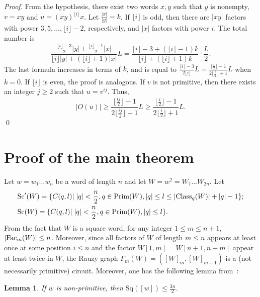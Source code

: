 \documentclass[runningheads,envcountsame,a4paper]{llncs}
\newtheorem{lem}[thm]{Lemma}
\newcommand{\fac}{\hbox{\rm Fac}}
\newcommand{\Class}{\hbox{\rm Class}}
\newcommand{\prim}{\hbox{\rm Prim}}
\newcommand{\sq}{\mathrm{Sq}}
\renewcommand{\sc}{\mathrm{Sc}}
\begin{document}
\begin{proof}
From the hypothesis, there exist two words $x, y$ such that $y$ is nonempty,  $v=xy$ and $u=(xy)^{\lfloor i \rfloor}x$. Let $\frac{|x|}{|y|}=k$. If $\lfloor i \rfloor$ is odd, then there are $|xy|$ factors with power $3,5,\ldots,\lfloor i \rfloor-2$, respectively, and $|x|$ factors with power $i$. The total number is 
$$\frac{\frac{\lfloor i \rfloor-3}{2}|y|+\frac{\lfloor i \rfloor-1}{2}|x|}{\lfloor i \rfloor|y|+(\lfloor i \rfloor+1)|x|}L=\frac{\lfloor i \rfloor-3+(\lfloor i \rfloor-1)
k}{\lfloor i \rfloor+(\lfloor i \rfloor+1)k}\cdot\frac{L}{2}.$$ The last formula increases in terms of $k$, and is equal to $\frac{\lfloor i \rfloor-3}{2\lfloor i \rfloor}L=\frac{\lfloor \frac i2 \rfloor-1}{2\lfloor \frac i2 \rfloor+1}L$ when $k=0$. If $\lfloor i \rfloor$ is even, the proof is analogous. 
If $v$ is not primitive, then there exists an integer $j\geq 2$ such that 
$u=v^{ij}$. Thus, 
$$|O(u)|\ge\frac{\lfloor \frac {ij}{2} \rfloor-1}{2\lfloor \frac {ij}{2} \rfloor+1}L\ge\frac{\lfloor \frac i2 \rfloor-1}{2\lfloor \frac i2 \rfloor+1}L.$$ \qed
\end{proof} 
\fi










\section{Proof of the main theorem}\label{sec4}

Let $w=w_1\ldots w_n$ be a word of length $n$ and let $W=w^2=W_1\ldots W_{2n}$. Let
\begin{eqnarray*}
&\sc'(W)=\{C(q,l)| \;|q|< \frac{n}{2}, q\in\prim(W), |q|\leq l\leq |\Class_q(W)|+|q|-1\};\\ 
&\sc(W)=\{C(q,l)| \;|q|< \frac{n}{2}, q\in\prim(W), |q|\leq l\}.    
\end{eqnarray*}
From the fact that $W$ is a square word, for any integer $1\leq m\le n+1$, $|\fac_m(W)|\leq n$. Moreover, since all factors of $W$ of length $m \leq n$ appears at least once at some position $i \leq n$ and the factor $W[1,m]=W[n+1,n+m]$ appear at least twice in $W$, the Rauzy graph $\Gamma_m(W)=([W]_m, [W]_{m+1})$ is a (not necessarily primitive) circuit. Moreover, one has the following lemma from~\cite{CMRRWZ26}:
\begin{lem}\label{multi}
If $w$ is non-primitive, then $\sq([w])\leq \frac{3n}{2}$.
\end{lem}
\end{document}
